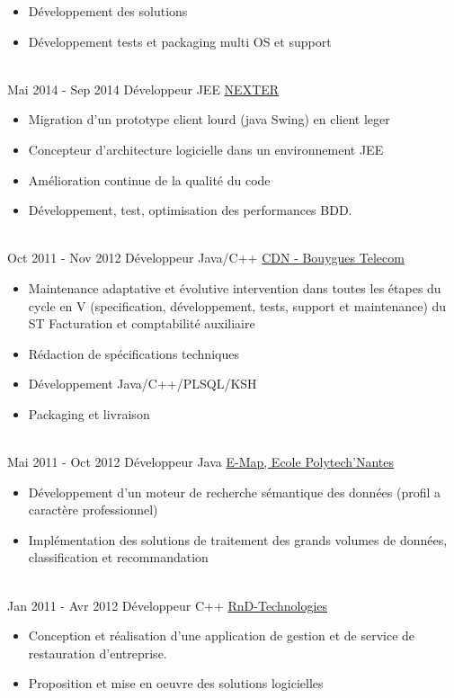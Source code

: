 \documentclass[letterpaper]{twentysecondcv} %
\begin{document}
\begin{twenty}
{\begin{itemize}
        \item Développement des solutions
        \item Développement tests et packaging multi OS et support
    	\end{itemize}
    	}
	\\   
		\twentyitem
		{Mai 2014 -}
		{Sep 2014}
		{Développeur JEE}
		{\href{https://www.nexter-group.fr/}{NEXTER}}
		{}
		{
		\begin{itemize}
		\item Migration d'un prototype client lourd (java Swing) en client leger
		\item Concepteur d'architecture logicielle dans un environnement JEE
		\item Amélioration continue de la qualité du code
		\item Développement, test, optimisation des performances BDD.
		\end{itemize}
		}       
       \\
	    \twentyitem
	    {Oct 2011 -}
	    {Nov 2012}
	    {Développeur Java/C++}
	    {\href{https://www.jobs.bouyguestelecom.fr/}{CDN - Bouygues Telecom}}
	    {}
	    {
	    \begin{itemize}
	    \item Maintenance adaptative et évolutive intervention dans toutes les étapes du cycle en V (specification, développement, tests, support et maintenance) du ST Facturation et comptabilité auxiliaire
	    \item Rédaction de spécifications techniques
	    \item Développement Java/C++/PLSQL/KSH
	    \item Packaging et livraison	
	    \end{itemize}
	    }
    
	   \\
	    \twentyitem
	    {Mai 2011 -}
	    {Oct 2012}
	    {Développeur Java}
	    {\href{}{E-Map, Ecole Polytech'Nantes}}
	    {}
	    {
	    \begin{itemize}
	    \item Développement d'un moteur de recherche sémantique des données (profil a caractère professionnel)
	    \item Implémentation des solutions de traitement des grands volumes de données, classification et recommandation	
	    \end{itemize}
	    }

	   \\
	    \twentyitem
	    {Jan 2011 -}
	    {Avr 2012}
	    {Développeur C++}
	    {\href{}{RnD-Technologies}}
	    {}
	    {
	    \begin{itemize}
		\item Conception et réalisation d'une application de gestion et de service de restauration d'entreprise.
		\item Proposition et mise en oeuvre des solutions logicielles	
	    \end{itemize}
	    }


\end{twenty}
\end{document}
